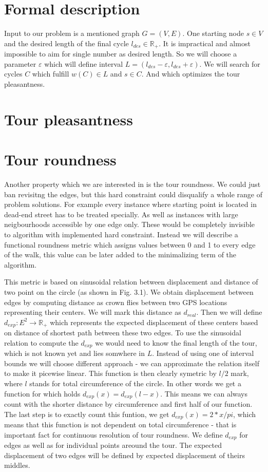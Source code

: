 \documentclass{ctuthesis}
\begin{document}
\section{Formal description}
Input to our problem is a mentioned graph \(G=(V, E)\). One starting node \(s \in V\) and the desired length of the final cycle \(l_{des} \in \mathbb{R_+}\). It is impractical and almost impossible to aim for single number as desired length. So we will choose a parameter \(\varepsilon\) which will define interval \(L = (l_{des}-\varepsilon, l_{des}+\varepsilon)\). We will search for cycles \(C\) which fulfill \(w(C) \in L\) and \(s \in C\). And which optimizes the tour pleasantness.
	
\section{Tour pleasantness}

\section{Tour roundness}
Another property which we are interested in is the tour roundness. We could just ban revisitng the edges, but this hard constraint could disqualify a whole range of problem solutions. For example every instance where starting point is located in dead-end street has to be treated specially. As well as instances with large neigbourhoods accessible by one edge only. These would be completely invisible to algorithm with implemented hard constraint. Instead we will describe a functional roundness metric which assigns values between 0 and 1 to every edge of the walk, this value can be later added to the minimalizing term of the algorithm.\par
This metric is based on sinusoidal relation between displacement and distance of two point on the circle (as shown in Fig. 3.1). We obtain displacement between edges by computing distance as crown flies between two GPS locations representing their centers. We will mark this distance as \(d_{real}\). Then we will define \(d_{exp}: E^2 \rightarrow \mathbb{R_+}\) which represents the expected displacement of these centers based on distance of shortest path between these two edges. To use the sinusoidal relation to compute the \(d_{exp}\) we would need to know the final length of the tour, which is not known yet and lies somwhere in \(L\). Instead of using one of interval bounds we will choose different approach - we can approximate the relation itself to make it picewise linear. This function is then clearly symetric by \(l/2\) mark, where \(l\) stands for total circumference of the circle. In other words we get a function for which holds \(d_{exp}(x) = d_{exp}(l-x)\). This means we can always count with the shorter distance by circumference and first half of our function. The last step is to exactly count this funtion, we get \(d_{exp}(x)=2*x/{pi}\), which means that this function is not dependent on total circumference - that is important fact for continuous resolution of tour roundness.
We define \(d_{exp}\) for edges as well as for individual points areound the tour. The expected displacement of two edges will be defined by expected displacement of theirs middles.
\end{document}
